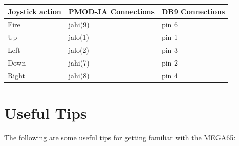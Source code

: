 \begin{minipage}{\linewidth}
\begin{center}
  \begin{longtable}{|L{3cm}|L{3cm}|p{3cm}|}
    \hline
    {\textbf{Joystick action}} & {\textbf{PMOD-JA Connections}} & {\textbf{DB9 Connections}} \\
    \hline
    {Fire} & {jahi(9)} & {pin 6} \\
    \hline
    {Up} & {jalo(1)} & {pin 1} \\
    \hline
    {Left} & {jalo(2)} & {pin 3} \\
    \hline
    {Down} & {jahi(7)} & {pin 2} \\
    \hline
    {Right} & {jahi(8)} & {pin 4} \\
    \hline
  \end{longtable}
\end{center}
\end{minipage}


\section{Useful Tips}

The following are some useful tips for getting familiar with the MEGA65:

